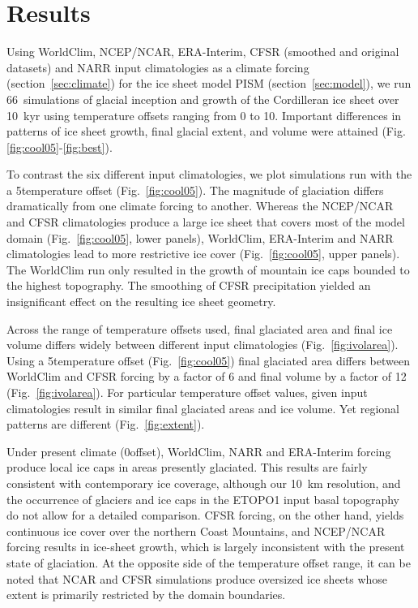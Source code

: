 \section{Results}
\label{sec:results}

Using WorldClim, NCEP/NCAR, ERA-Interim, CFSR (smoothed and original datasets) and NARR input climatologies as a climate forcing (section~\ref{sec:climate}) for the ice sheet model PISM (section~\ref{sec:model}), we run 66~simulations of glacial inception and growth of the Cordilleran ice sheet over 10~kyr using temperature offsets ranging from 0 to 10\degC. Important differences in patterns of ice sheet growth, final glacial extent, and volume were attained (Fig. \ref{fig:cool05}-\ref{fig:best}).

To contrast the six different input climatologies, we plot simulations run with the a 5\degC temperature offset (Fig.~\ref{fig:cool05}). The magnitude of glaciation differs dramatically from one climate forcing to another. Whereas the NCEP/NCAR and CFSR climatologies produce a large ice sheet that covers most of the model domain (Fig.~\ref{fig:cool05}, lower panels), WorldClim, ERA-Interim and NARR climatologies lead to more restrictive ice cover (Fig.~\ref{fig:cool05}, upper panels). The WorldClim run only resulted in the growth of mountain ice caps bounded to the highest topography. The smoothing of CFSR precipitation yielded an insignificant effect on the resulting ice sheet geometry.

Across the range of temperature offsets used, final glaciated area and final ice volume differs widely between different input climatologies (Fig.~\ref{fig:ivolarea}). Using a 5\degC temperature offset (Fig.~\ref{fig:cool05}) final glaciated area differs between WorldClim and CFSR forcing by a factor of 6 and final volume by a factor of 12 (Fig.~\ref{fig:ivolarea}). For particular temperature offset values, given input climatologies result in similar final glaciated areas and ice volume. Yet regional patterns are different (Fig.~\ref{fig:extent}).

Under present climate (0\degC offset), WorldClim, NARR and ERA-Interim forcing produce local ice caps in areas presently glaciated. This results are fairly consistent with contemporary ice coverage, although our 10~km resolution, and the occurrence of glaciers and ice caps in the ETOPO1 input basal topography do not allow for a detailed comparison. CFSR forcing, on the other hand, yields continuous ice cover over the northern Coast Mountains, and NCEP/NCAR forcing results in ice-sheet growth, which is largely inconsistent with the present state of glaciation. At the opposite side of the temperature offset range, it can be noted that NCAR and CFSR simulations produce oversized ice sheets whose extent is primarily restricted by the domain boundaries.

